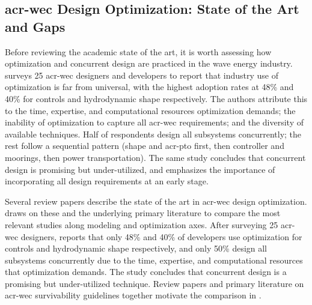 \subsection{\gls{acr-wec} Design Optimization: State of the Art and Gaps}
\label{remdo:sec:lit}

\ifdefined\DISSERTATION
    Before reviewing the academic state of the art, it is worth assessing how optimization and concurrent design are practiced in the wave energy industry.
    \citet{trueworthy_wave_2020} surveys 25 \gls{acr-wec} designers and developers to report that industry use of optimization is far from universal, with the highest adoption rates at 48\% and 40\% for controls and hydrodynamic shape respectively.
    The authors attribute this to the time, expertise, and computational resources optimization demands; the inability of optimization to capture all \gls{acr-wec} requirements; and the diversity of available techniques.
    Half of respondents design all subsystems concurrently; the rest follow a sequential pattern (shape and \gls{acr-pto} first, then controller and moorings, then power transportation).
    The same study concludes that concurrent design is promising but under-utilized, and emphasizes the importance of incorporating all design requirements at an early stage.
    
    Several review papers describe the state of the art in \gls{acr-wec} design optimization.
     draws on these and the underlying primary literature \citep{garcia-teruel_review_2021,guo_geometric_2021,ringwood_empowering_2023,clark_reliability-based_2018,coe_survey_2018,ove_arup__partners_ltd_structural_2016,paduano_towards_2024,giannini_wave_2022} to compare the most relevant studies along modeling and optimization axes.
\else
    After surveying 25 \gls{acr-wec} designers, \citet{trueworthy_wave_2020} reports that only 48\% and 40\% of developers use optimization for controls and hydrodynamic shape respectively, and only 50\% design all subsystems concurrently due to the time, expertise, and computational resources that optimization demands.
    The study concludes that concurrent design is a promising but under-utilized technique.
    Review papers \citep{garcia-teruel_review_2021,guo_geometric_2021,ringwood_empowering_2023,clark_reliability-based_2018} and primary literature on \gls{acr-wec} survivability guidelines \citep{coe_survey_2018,ove_arup__partners_ltd_structural_2016,paduano_towards_2024,giannini_wave_2022} together motivate the comparison in .
\fi

